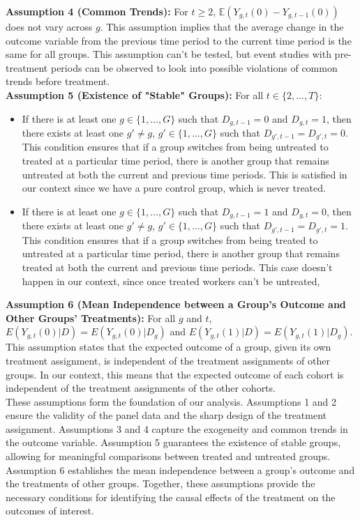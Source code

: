 \documentclass[oneside,11pt]{article}
\begin{document}
\textbf{Assumption 4 (Common Trends):} For $t \geq 2$, $\mathbb{E}(Y_{g,t}(0) - Y_{g,t-1}(0))$ does not vary across $g$. This assumption implies that the average change in the outcome variable from the previous time period to the current time period is the same for all groups. This assumption can't be tested, but event studies with pre-treatment periods can be observed to look into possible violations of common trends before treatment. \\

\textbf{Assumption 5 (Existence of "Stable" Groups):} For all $t \in \{2, \ldots, T\}$:
\begin{itemize}
    \item If there is at least one $g \in \{1, \ldots, G\}$ such that $D_{g,t-1} = 0$ and $D_{g,t} = 1$, then there exists at least one $g' \neq g$, $g' \in \{1, \ldots, G\}$ such that $D_{g',t-1} = D_{g',t} = 0$. This condition ensures that if a group switches from being untreated to treated at a particular time period, there is another group that remains untreated at both the current and previous time periods. This is satisfied in our context since we have a pure control group, which is never treated.
    \item If there is at least one $g \in \{1, \ldots, G\}$ such that $D_{g,t-1} = 1$ and $D_{g,t} = 0$, then there exists at least one $g' \neq g$, $g' \in \{1, \ldots, G\}$ such that $D_{g',t-1} = D_{g',t} = 1$. This condition ensures that if a group switches from being treated to untreated at a particular time period, there is another group that remains treated at both the current and previous time periods. This case doesn't happen in our context, since once treated workers can't be untreated,
\end{itemize}

\textbf{Assumption 6 (Mean Independence between a Group's Outcome and Other Groups' Treatments):} For all $g$ and $t$, $E(Y_{g,t}(0)|D) = E(Y_{g,t}(0)|D_g)$ and $E(Y_{g,t}(1)|D) = E(Y_{g,t}(1)|D_g)$. This assumption states that the expected outcome of a group, given its own treatment assignment, is independent of the treatment assignments of other groups. In our context, this means that the expected outcome of each cohort is independent of the treatment assignments of the other cohorts. \\

These assumptions form the foundation of our analysis. Assumptions 1 and 2 ensure the validity of the panel data and the sharp design of the treatment assignment. Assumptions 3 and 4 capture the exogeneity and common trends in the outcome variable. Assumption 5 guarantees the existence of stable groups, allowing for meaningful comparisons between treated and untreated groups. Assumption 6 establishes the mean independence between a group's outcome and the treatments of other groups. Together, these assumptions provide the necessary conditions for identifying the causal effects of the treatment on the outcomes of interest. 
\end{document}

